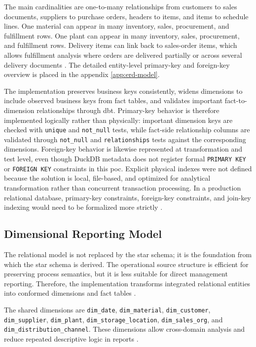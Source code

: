 The main cardinalities are one-to-many relationships from customers to sales documents, suppliers to purchase orders, headers to items, and items to schedule lines. One material can appear in many inventory, sales, procurement, and fulfillment rows. One plant can appear in many inventory, sales, procurement, and fulfillment rows. Delivery items can link back to sales-order items, which allows fulfillment analysis where orders are delivered partially or across several delivery documents \parencite{codd_relational_1970}. The detailed entity-level primary-key and foreign-key overview is placed in the appendix \ref{app:erd-model}.

The implementation preserves business keys consistently, widens dimensions to include observed business keys from fact tables, and validates important fact-to-dimension relationships through \ac{dbt}. Primary-key behavior is therefore implemented logically rather than physically: important dimension keys are checked with \texttt{unique} and \texttt{not\_null} tests, while fact-side relationship columns are validated through \texttt{not\_null} and \texttt{relationships} tests against the corresponding dimensions. Foreign-key behavior is likewise represented at transformation and test level, even though DuckDB metadata does not register formal \texttt{PRIMARY KEY} or \texttt{FOREIGN KEY} constraints in this \ac{poc}. Explicit physical indexes were not defined because the solution is local, file-based, and optimized for analytical transformation rather than concurrent transaction processing. In a production relational database, primary-key constraints, foreign-key constraints, and join-key indexing would need to be formalized more strictly \parencite{codd_relational_1970}.

\subsection{Dimensional Reporting Model}

The relational model is not replaced by the star schema; it is the foundation from which the star schema is derived. The operational source structure is efficient for preserving process semantics, but it is less suitable for direct management reporting. Therefore, the implementation transforms integrated relational entities into conformed dimensions and fact tables \parencite{moody_enterprise_2000}.

The shared dimensions are \texttt{dim\_date}, \texttt{dim\_material}, \texttt{dim\_customer}, \texttt{dim\_supplier}, \texttt{dim\_plant}, \texttt{dim\_storage\_location}, \texttt{dim\_sales\_org}, and \texttt{dim\_distribution\_channel}. These dimensions allow cross-domain analysis and reduce repeated descriptive logic in reports \parencite{takacs_data_2020}.

